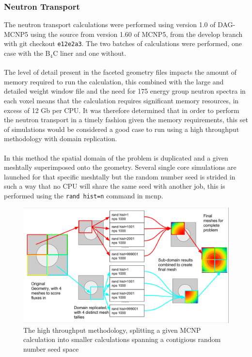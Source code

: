 \documentclass[12pt]{article}
\begin{document}
\subsubsection{Neutron Transport}
The neutron transport calculations were performed using version 1.0 of DAG-MCNP5
using the source from version 1.60 of MCNP5, from the develop branch with git
checkout \texttt{e12e2a3}. The two batches of calculations were performed, one
case with the B$_4$C liner and one without.
\\
\\
The level of detail present in the faceted geometry files impacts the amount of
memory required to run the calculation, this combined with the large and
detailed weight window file and the need for 175 energy group neutron spectra
in each voxel means that the calculation requires significant memory resources,
in excess of 12 Gb per CPU. It was therefore determined that in order to perform
the neutron transport in a timely fashion given the memory requirements, this
set of simulations would be considered a good case to run using a high
throughput methodology with domain replication.
\\
\\
In this method the spatial domain of the problem is duplicated and a given
meshtally superimposed onto the geometry. Several single core simulations are
launched for that specific meshtally but the random number seed is strided in
such a way that no CPU will share the same seed with another job, this is
performed using the \texttt{rand hist=n} command in \gls{mcnp}.
\begin{figure}[ht!]
  \centering
  \includegraphics[scale=0.3]{../plots/method/neutron_method.png}
  \caption{The high throughput methodology, splitting a given MCNP calculation
           into smaller calculations spanning a contigious random number seed
           space}
  \label{fig:mesh_spliting}
\end{figure}
\end{document}
